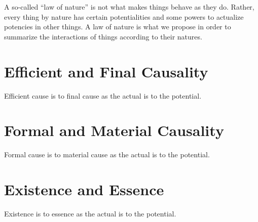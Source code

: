 \documentclass[twocolumn]{article}
\begin{document}
A so-called ``law of nature'' is not what makes things behave as they do.
Rather, every thing by nature has certain potentialities and some powers to
actualize potencies in other things.  A law of nature is what we propose in
order to summarize the interactions of things according to their natures.

\section{Efficient and Final Causality}

Efficient cause is to final cause as the actual is to the potential.

\section{Formal and Material Causality}

Formal cause is to material cause as the actual is to the potential.

\section{Existence and Essence}

Existence is to essence as the actual is to the potential.


\end{document}

